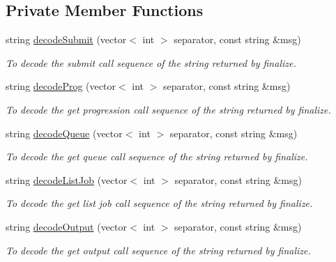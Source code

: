 \subsection*{Private Member Functions}
\begin{DoxyCompactItemize}
\item 
string \hyperlink{classTMSMapper_aa59a3b07e1d6149067d5c7ecee9d5586}{decodeSubmit} (vector$<$ int $>$ separator, const string \&msg)
\begin{DoxyCompactList}\small\item\em To decode the submit call sequence of the string returned by finalize. \item\end{DoxyCompactList}\item 
string \hyperlink{classTMSMapper_aaf50d5b60f32283e5d6785c839446cdc}{decodeProg} (vector$<$ int $>$ separator, const string \&msg)
\begin{DoxyCompactList}\small\item\em To decode the get progression call sequence of the string returned by finalize. \item\end{DoxyCompactList}\item 
string \hyperlink{classTMSMapper_a214f2d08465fc7a21343c4d74c67c255}{decodeQueue} (vector$<$ int $>$ separator, const string \&msg)
\begin{DoxyCompactList}\small\item\em To decode the get queue call sequence of the string returned by finalize. \item\end{DoxyCompactList}\item 
string \hyperlink{classTMSMapper_a60f6a62060a0587a401da0435a32892f}{decodeListJob} (vector$<$ int $>$ separator, const string \&msg)
\begin{DoxyCompactList}\small\item\em To decode the get list job call sequence of the string returned by finalize. \item\end{DoxyCompactList}\item 
string \hyperlink{classTMSMapper_aae8811bb1bf6bd8830154b1b1331002d}{decodeOutput} (vector$<$ int $>$ separator, const string \&msg)
\begin{DoxyCompactList}\small\item\em To decode the get output call sequence of the string returned by finalize. \item\end{DoxyCompactList}\item 

\end{DoxyCompactItemize}

